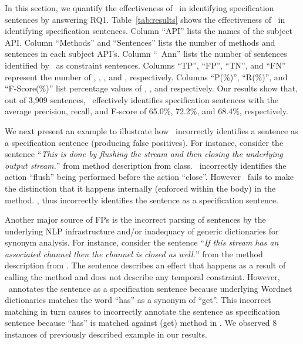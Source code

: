 In this section, we quantify the effectiveness of \tool\ in identifying specification sentences by answering RQ1.
Table~\ref{tab:results} shows the effectiveness of \tool\ in identifying specification sentences.
Column ``API'' lists the names of the subject API. 
Column ``Methods'' and ``Sentences'' lists the number of methods and sentences in each subject API's.
Column ``\tool\ Ann'' lists the number of sentences identified by \tool\ as constraint sentences. 
Columns ``TP'', ``FP'', ``TN'', and ``FN'' represent the number of , , , and , respectively. 
Columns ``P(\%)'', ``R(\%)'', and ``F-Score(\%)'' list percentage values of , , and  respectively. 
Our results show that, out of 3,909 sentences, \tool\ effectively identifies specification sentences with the average precision, recall, and F-score of 65.0\%, 72.2\%, and 68.4\%, respectively.

 

We next present an example to illustrate how \tool\ incorrectly identifies a sentence as a specification sentence (producing false positives). For instance, consider the sentence ``\textit{This is done by flushing the stream and then closing the underlying output stream.}'' from   method description from  class. \tool\ incorrectly identifies the action ``flush'' being performed before the action ``close''. However \tool\ fails to make the distinction that it happens internally (enforced within the body) in the method. \tool, thus incorrectly identifies the sentence as a specification sentence.   


Another major source of FPs is the incorrect parsing of sentences by the underlying NLP infrastructure and/or inadequacy of generic dictionaries for synonym analysis. For instance, consider the sentence ``\textit{If this stream has an associated channel then the channel is closed as well.}'' from the  method description from . The sentence describes an effect that happens as a result of calling the  method and does not describe any temporal constraint. However, \tool\ annotates the sentence as a specification sentence because underlying Wordnet dictionaries matches the word ``has'' as a synonym of ``get''. This incorrect matching in turn causes \tool to incorrectly annotate the sentence as specification sentence because ``has'' is matched against \CodeIn(get) method in . We observed 8 instances of previously described example in our results.


